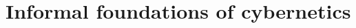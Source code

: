 \documentclass[../main.tex]{subfiles}
\begin{document}
\part{Informal foundations of cybernetics}


\end{document}
